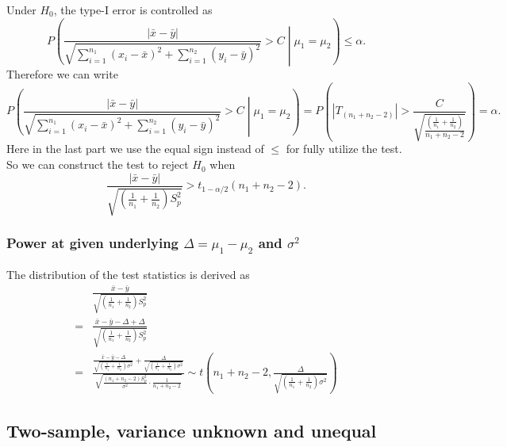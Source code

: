 \documentclass[a4paper,12pt]{article}
\begin{document}
Under $H_0$, the type-I error is controlled as
\[
  P\left(
        \frac{\left|\bar{x} - \bar{y}\right|}{
      \sqrt{
               \sum\limits_{i = 1}^{n_1}\left(x_i - \bar{x}\right)^2
       + \sum\limits_{i = 1}^{n_2}\left(y_i - \bar{y}\right)^2 
      }
    }
    > C
    \middle| \mu_1 = \mu_2
  \right)
  \leq \alpha
  .
\]
Therefore we can write
\[
  P\left(
    \frac{\left|\bar{x} - \bar{y}\right|}{
      \sqrt{
        \sum\limits_{i = 1}^{n_1}\left(x_i - \bar{x}\right)^2
        + \sum\limits_{i = 1}^{n_2}\left(y_i - \bar{y}\right)^2 
      }
    }
    > C
    \middle| \mu_1 = \mu_2
  \right)
  = P\left(
    \left|T_{\left(n_1 + n_2 - 2\right)}\right|
    > \frac{C}{
      \sqrt{\frac{
          \left(\frac{1}{n_1} + \frac{1}{n_2}\right)  
        }{
          n_1 + n_2 - 2
        }
      }
    }
  \right)
  = \alpha
  .
\]
Here in the last part we use the equal sign instead of $\leq$ for fully utilize the test. So we can construct the test to reject $H_0$ when
\[
  \frac{
    \left|\bar{x} - \bar{y}\right|
  }{
    \sqrt{
      \left(\frac{1}{n_1} + \frac{1}{n_2}\right)
      S_p^2
    }
  }
  > t_{1 - \alpha / 2}\left(n_1 + n_2 - 2\right)
  .
\]

\subsubsection{Power at given underlying $\Delta = \mu_1 - \mu_2$ and $\sigma^2$}
\label{sec:power-at-given-3}

The distribution of the test statistics is derived as
\[
  \begin{aligned}
  & \frac{
    \bar{x} - \bar{y}
  }{
    \sqrt{
      \left(\frac{1}{n_1} + \frac{1}{n_2}\right)
      S_p^2
    }
  }    \\
  =& \frac{
    \bar{x} - \bar{y}
    - \Delta
    + \Delta
  }{
    \sqrt{
      \left(\frac{1}{n_1} + \frac{1}{n_2}\right)
      S_p^2
    }
  }    \\
  =& \frac{
    \frac{
      \bar{x} - \bar{y} - \Delta
    }{
      \sqrt{\left(\frac{1}{n_1} + \frac{1}{n_2}\right)\sigma^2}
    }
    + \frac{\Delta}{\sqrt{\left(\frac{1}{n_1} + \frac{1}{n_2}\right)\sigma^2}}    
  }{
    \sqrt{
      \frac{\left(n_1 + n_2 - 2\right)S_p^2}{\sigma^2}
      \cdot \frac{1}{n_1 + n_2 - 2}
    }
  }
  \sim t(
  n_1 + n_2 - 2,
  \frac{\Delta}{\sqrt{\left(\frac{1}{n_1} + \frac{1}{n_2}\right)\sigma^2}}
  )    
  \end{aligned}
\]

\subsection{Two-sample, variance unknown and unequal}
\label{sec:two-sample-variance-2}
\end{document}
